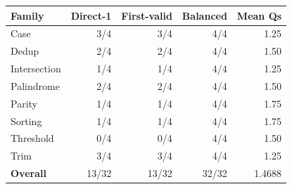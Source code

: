 \renewcommand{\arraystretch}{1.12}
\begin{tabular}{@{}lrrrr@{}}
\toprule
Family & Direct-1 & First-valid & Balanced & Mean Qs \\ \midrule
Case & 3/4 & 3/4 & 4/4 & 1.25 \\
Dedup & 2/4 & 2/4 & 4/4 & 1.50 \\
Intersection & 1/4 & 1/4 & 4/4 & 1.25 \\
Palindrome & 2/4 & 2/4 & 4/4 & 1.50 \\
Parity & 1/4 & 1/4 & 4/4 & 1.75 \\
Sorting & 1/4 & 1/4 & 4/4 & 1.75 \\
Threshold & 0/4 & 0/4 & 4/4 & 1.50 \\
Trim & 3/4 & 3/4 & 4/4 & 1.25 \\
\textbf{Overall} & 13/32 & 13/32 & 32/32 & 1.4688 \\
\bottomrule
\end{tabular}
